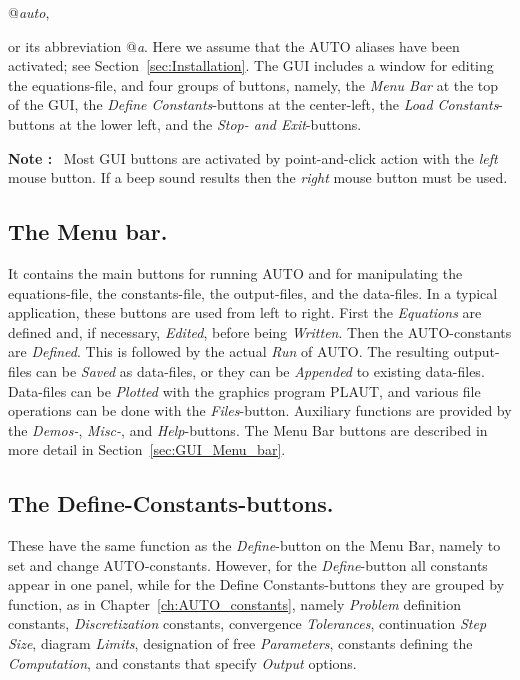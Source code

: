 \documentclass[12pt]{report}
\begin{document}
\centerline { @{\it auto}, }

or its abbreviation @{\it a}.
Here we assume that the {\cal AUTO} aliases have been activated; 
see Section~\ref{sec:Installation}.
The GUI includes a window for editing the equations-file,
and four groups of buttons, namely,
the {\it Menu Bar} at the top of the GUI,
the {\it Define Constants}-buttons at the center-left,
the {\it Load Constants}-buttons at the lower left,
and the {\it Stop- and Exit}-buttons.

{\bf Note :}~
Most GUI buttons are activated by point-and-click action with 
the {\it left} mouse button. 
If a beep sound results then the {\it right} mouse button must be used. 

\subsection{ The Menu bar.}
It contains the main buttons for running {\cal AUTO}
and for manipulating the equations-file, the constants-file,
the output-files, and the data-files.
In a typical application, these buttons are used from left to right.
First the {\it Equations} are defined and, if necessary, {\it Edited},
before being {\it Written}.
Then the {\cal AUTO}-constants are {\it Defined}.
This is followed by the actual {\it Run} of {\cal AUTO}.
The resulting output-files can be {\it Saved} as data-files,
or they can be {\it Appended} to existing data-files.
Data-files can be {\it Plotted} with the graphics program {\cal PLAUT},
and various file operations can be done with the {\it Files}-button.
Auxiliary functions are provided by the {\it Demos-}, {\it Misc-},
and {\it Help}-buttons.
The Menu Bar buttons are described in more detail 
in Section~\ref{sec:GUI_Menu_bar}.


\subsection{ The Define-Constants-buttons.}
These have the same function as
the {\it Define}-button on the  Menu Bar, namely to set and change
{\cal AUTO}-constants.
However, 
for the {\it Define}-button all constants appear in one panel, 
while 
for the Define Constants-buttons they
are grouped by function, 
as in Chapter~\ref{ch:AUTO_constants}, namely
{\it Problem} definition constants,
{\it Discretization} constants,
convergence {\it Tolerances},
continuation {\it Step Size},
diagram {\it Limits},
designation of free {\it Parameters},
constants defining the {\it Computation},
and
constants that specify {\it Output} options.
\end{document}
